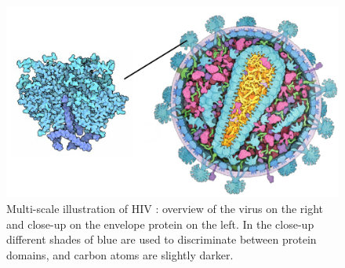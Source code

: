 \documentclass{egpubl}
\begin{document}
	
	
	
	
	\begin{figure}
		\centering
		\includegraphics[width=1\linewidth]{Figures/motivation}
				\caption{Multi-scale illustration of HIV \cite{RCSBPDB2011}: overview of the virus on the right and close-up on the envelope protein on the left. In the close-up different shades of blue are used to discriminate between protein domains, and carbon atoms are slightly darker. }
		\label{fig:motivation}
	\end{figure}
	
\end{document}

